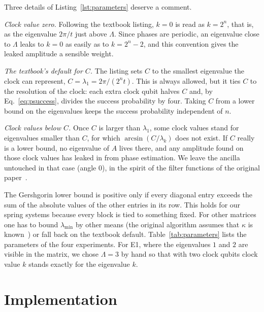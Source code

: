 \documentclass[manuscript,screen,review,nonacm]{acmart}
\begin{document}
Three details of Listing~\ref{lst:parameters} deserve a comment.

\emph{Clock value zero.} Following the textbook listing, $k=0$ is read as
$k=2^n$, that is, as the eigenvalue $2\pi/t$ just above $\Lambda$. Since
phases are periodic, an eigenvalue close to $\Lambda$ leaks to $k=0$ as easily
as to $k=2^n-2$, and this convention gives the leaked amplitude a sensible
weight.

\emph{The textbook's default for $C$.} The listing sets $C$ to the smallest
eigenvalue the clock can represent, $C=\lambda_1=2\pi/(2^n t)$. This is always
allowed, but it ties $C$ to the resolution of the clock: each extra clock qubit
halves $C$ and, by Eq.~\eqref{eq:psuccess}, divides the success probability by
four. Taking $C$ from a lower bound on the eigenvalues keeps the success
probability independent of $n$.

\emph{Clock values below $C$.} Once $C$ is larger than $\lambda_1$, some clock
values stand for eigenvalues smaller than $C$, for which $\arcsin(C/\lambda_k)$
does not exist. If $C$ really is a lower bound, no eigenvalue of $A$ lives
there, and any amplitude found on those clock values has leaked in from phase
estimation. We leave the ancilla untouched in that case (angle 0), in the
spirit of the filter functions of the original paper~\cite{harrow2009}.

The Gershgorin lower bound is positive only if every diagonal entry exceeds
the sum of the absolute values of the other entries in its row. This holds for
our spring systems because every block is tied to something fixed. For other
matrices one has to bound $\lambda_{\min}$ by other means (the original
algorithm assumes that $\kappa$ is known~\cite{harrow2009}) or fall back on the
textbook default. Table~\ref{tab:parameters} lists the parameters of the
four experiments. For E1, where the eigenvalues $1$ and $2$ are visible in the
matrix, we chose $\Lambda=3$ by hand so that with two clock qubits clock value
$k$ stands exactly for the eigenvalue $k$.

\begin{table}[t]
  \caption{The four experiments. $C$ and $\Lambda$ are the lower and upper
    eigenvalue bounds, $n$ the number of clock qubits and $t$ the evolution
    time of Eq.~\eqref{eq:tchoice}. The qubit count includes the ancilla.}
  \label{tab:parameters}
  \small
  
\end{table}

\section{Implementation}
\label{sec:implementation}
\end{document}
